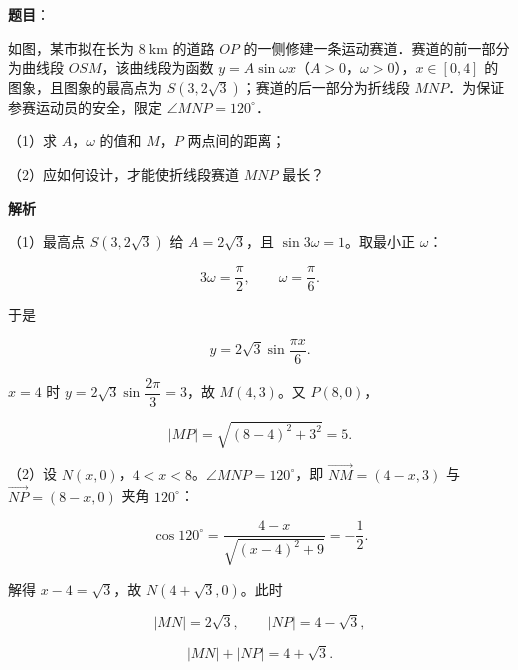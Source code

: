 \begin{answer}

\textbf{题目}：

如图，某市拟在长为 $8\ \mathrm{km}$ 的道路 $OP$ 的一侧修建一条运动赛道．赛道的前一部分为曲线段 $OSM$，该曲线段为函数 $y=A\sin\omega x$（$A>0$，$\omega>0$），$x\in[0,4]$ 的图象，且图象的最高点为 $S(3,2\sqrt3)$；赛道的后一部分为折线段 $MNP$．为保证参赛运动员的安全，限定 $\angle MNP=120^\circ$．

（1）求 $A$，$\omega$ 的值和 $M$，$P$ 两点间的距离；

（2）应如何设计，才能使折线段赛道 $MNP$ 最长？
\nopagebreak[4]
\begin{center}\end{center}
\nopagebreak[4]
\textbf{解析}

（1）最高点 $S(3,2\sqrt3)$ 给 $A=2\sqrt3$，且 $\sin3\omega=1$。取最小正 $\omega$：

\nopagebreak[4]
\[3\omega=\frac\pi2,\qquad \omega=\frac\pi6.\]

于是

\nopagebreak[4]
\[y=2\sqrt3\sin\frac{\pi x}6.\]

$x=4$ 时 $y=2\sqrt3\sin\dfrac{2\pi}3=3$，故 $M(4,3)$。又 $P(8,0)$，

\nopagebreak[4]
\[|MP|=\sqrt{(8-4)^2+3^2}=5.\]

（2）设 $N(x,0)$，$4<x<8$。$\angle MNP=120^\circ$，即 $\overrightarrow{NM}=(4-x,3)$ 与 $\overrightarrow{NP}=(8-x,0)$ 夹角 $120^\circ$：

\nopagebreak[4]
\[\cos120^\circ=\frac{4-x}{\sqrt{(x-4)^2+9}}=-\frac12.\]

解得 $x-4=\sqrt3$，故 $N(4+\sqrt3,0)$。此时

\nopagebreak[4]
\[|MN|=2\sqrt3,\qquad |NP|=4-\sqrt3,\]

\nopagebreak[4]
\[|MN|+|NP|=4+\sqrt3.\]


\end{answer}

